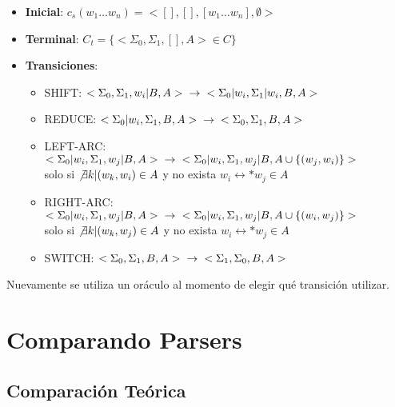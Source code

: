 \documentclass[11pt,a4paper,spanish]{article}
\begin{document}
\begin{itemize}
\item \textbf{Inicial}: $c_s(w_1\dots w_n) = <[],[],[w_1\dots w_n],\emptyset>$
\item \textbf{Terminal}: $C_t = \{<\Sigma_0,\Sigma_1,[],A>\in C\}$
\item \textbf{Transiciones}:   
    \begin{itemize}
    \item SHIFT:      $<\Sigma_0,\Sigma_1,w_i|B,A> \hspace{0.2cm} \rightarrow \hspace{0.2cm} 
<\Sigma_0|w_i,\Sigma_1|w_i,B,A>$
    \item REDUCE:     $<\Sigma_0|w_i,\Sigma_1,B,A> \hspace{0.2cm} \rightarrow \hspace{0.2cm} 
<\Sigma_0,\Sigma_1,B,A>$ 
    \item LEFT-ARC:   $<\Sigma_0|w_i,\Sigma_1,w_j|B,A> \hspace{0.2cm} \rightarrow \hspace{0.2cm} 
<\Sigma_0|w_i,\Sigma_1,w_j|B,A\cup \{(w_j,w_i)\}>$ \\
solo si $\not\exists k | (w_k,w_i)\in A$ y no exista $w_i \leftrightarrow * w_j\in A$
    \item RIGHT-ARC: $<\Sigma_0|w_i,\Sigma_1,w_j|B,A> \hspace{0.2cm}\rightarrow \hspace{0.2cm} 
<\Sigma_0|w_i,\Sigma_1,w_j|B,A\cup \{(w_i,w_j)\}>$ \\ 
solo si $\not\exists k | (w_k,w_j)\in A$ y no exista $w_i \leftrightarrow * w_j\in A$
    \item SWITCH: $<\Sigma_0,\Sigma_1,B,A> \hspace{0.2cm} \rightarrow \hspace{0.2cm} 
<\Sigma_1,\Sigma_0,B,A>$
    \end{itemize}
\end{itemize}

Nuevamente se utiliza un oráculo al momento de elegir qué transición utilizar.

\newpage
\section{Comparando Parsers}

\subsection{Comparación Teórica}
\end{document}

